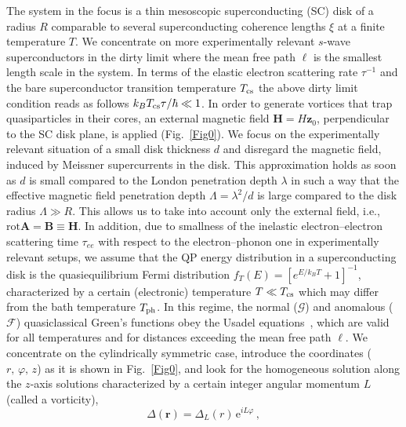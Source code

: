 \documentclass[prx,twocolumn,aps,superscriptaddress,showpacs,amsmath,amssymb,footnoteinbib]{revtex4-1}
\begin{document}
The system in the focus is a thin mesoscopic superconducting (SC)
disk of a radius $R$ comparable to several superconducting
coherence lengths $\xi$ at a finite temperature $T$. We
concentrate on more experimentally relevant $s$-wave
superconductors in the dirty limit where the mean free path $\ell$ is
the smallest length scale in the system. In terms of the elastic
electron scattering rate $\tau^{-1}$ and the bare superconductor
transition temperature $T_{\rm cs}$ the above dirty limit
condition reads as follows $k_B T_{\rm cs} \tau/\hbar \ll 1$. In order to
generate vortices that trap quasiparticles in their cores, an
external magnetic field $\mathbf{H} = H \mathbf{z}_0$,
perpendicular to the SC disk plane, is applied (Fig.~\ref{Fig0}).
We focus on the experimentally relevant situation of a small disk
thickness $d$ and disregard the magnetic field, induced by
Meissner supercurrents in the disk. This approximation holds as
soon as $d$ is small compared to the London penetration depth
$\lambda$ in such a way that the effective magnetic field
penetration depth $\Lambda = \lambda^2 / d$ is large compared to
the disk radius $\Lambda \gg R$. This allows us to take into
account only the external field, i.e., $\mathrm{rot}\mathbf{A} =
\mathbf{B} \equiv \mathbf{H}$. In addition, due to smallness of the
inelastic electron--electron scattering time $\tau_{ee}$ with respect to
the electron--phonon one in experimentally relevant setups,
we assume that the QP energy distribution in a superconducting disk is the quasiequilibrium
Fermi distribution $f_T(E) = [e^{E/k_B T}+1]^{-1}$, characterized by a certain
(electronic) temperature $T \ll T_{\rm cs}$ which may differ from the
bath temperature $T_{\rm ph}$. %
In this regime, the normal
($\mathcal{G}$) and anomalous ($\mathcal{F}$) quasiclassical
Green's functions obey the Usadel equations~\cite{Usadel-PRL70},
which are valid for all temperatures and for distances exceeding
the mean free path $\ell$. We concentrate on the cylindrically
symmetric case, introduce the coordinates ($r,\,\varphi,\,z$) as
it is shown in Fig.~\ref{Fig0}, and look for the homogeneous solution along
the $z$-axis solutions characterized by a certain integer angular
momentum $L$ (called a vorticity), %
%
\begin{equation}\label{Delta_eq}
 \Delta(\mathbf{r}) = \Delta_L(r)\, \mathrm{e}^{i L \varphi}\,,
\end{equation}
\end{document}
